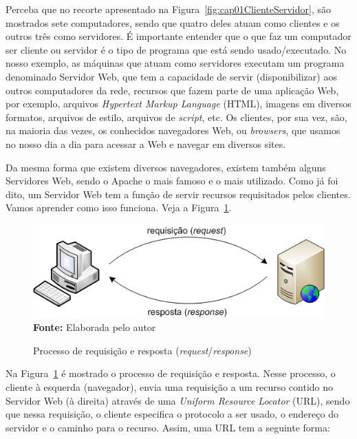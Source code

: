 Perceba que no recorte apresentado na Figura~\ref{fig:cap01ClienteServidor}, são mostrados sete computadores, sendo que quatro deles atuam como clientes e os outros três como servidores. É importante entender que o que faz um computador ser cliente ou servidor é o tipo de programa que está sendo usado/executado. No nosso exemplo, as máquinas que atuam como servidores executam um programa denominado Servidor Web, que tem a capacidade de servir (disponibilizar) aos outros computadores da rede, recursos que fazem parte de uma aplicação Web, por exemplo, arquivos \textit{Hypertext Markup Language} (HTML), imagens em diversos formatos, arquivos de estilo, arquivos de \textit{script}, etc. Os clientes, por sua vez, são, na maioria das vezes, os conhecidos navegadores Web, ou \textit{browsers}, que usamos no nosso dia a dia para acessar a Web e navegar em diversos sites.

Da mesma forma que existem diversos navegadores, existem também alguns Servidores Web, sendo o Apache o mais famoso e o mais utilizado. Como já foi dito, um Servidor Web tem a função de servir recursos requisitados pelos clientes. Vamos aprender como isso funciona. Veja a Figura~\ref{fig:cap01RequestResponse}.

\FloatBarrier
\begin{figure}[!htbp]
    \centering
    \caption{Processo de requisição e resposta (\textit{request}/\textit{response})}
    \includegraphics[scale=0.6]{imagens/cap01RequestResponse}
    \\\textbf{Fonte:} Elaborada pelo autor
    \label{fig:cap01RequestResponse}
\end{figure}
\FloatBarrier

Na Figura~\ref{fig:cap01RequestResponse} é mostrado o processo de requisição e resposta. Nesse processo, o cliente à esquerda (navegador), envia uma requisição a um recurso contido no Servidor Web (à direita) através de uma \textit{Uniform Resource Locator} (URL), sendo que nessa requisição, o cliente especifica o protocolo a ser usado, o endereço do servidor e o caminho para o recurso. Assim, uma URL tem a seguinte forma:


